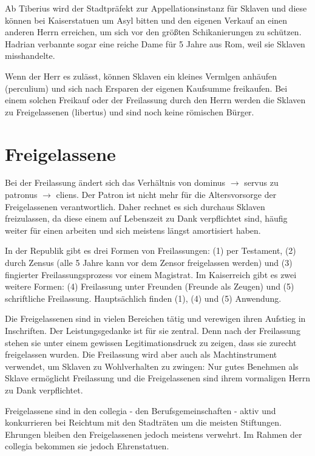 \documentclass[10pt,a4paper,oneside,ngerman,numbers=noenddot]{scrartcl}
\begin{document}
Ab Tiberius wird der Stadtpräfekt zur Appellationsinstanz für Sklaven und diese
können bei Kaiserstatuen um Asyl bitten und den eigenen Verkauf an einen anderen
Herrn erreichen, um sich vor den größten Schikanierungen zu schützen. Hadrian
verbannte sogar eine reiche Dame für 5 Jahre aus Rom, weil sie Sklaven
misshandelte.

Wenn der Herr es zulässt, können Sklaven ein kleines Vermlgen anhäufen (perculium)
und sich nach Ersparen der eigenen Kaufsumme freikaufen. Bei einem solchen
Freikauf oder der Freilassung durch den Herrn werden die Sklaven zu Freigelassenen
(libertus) und sind noch keine römischen Bürger.

\section*{Freigelassene}

Bei der Freilassung ändert sich das Verhältnis von dominus \(\rightarrow\) servus
zu patronus \(\rightarrow\) cliens. Der Patron ist nicht mehr für die
Altersvorsorge der Freigelassenen verantwortlich. Daher rechnet es sich durchaus
Sklaven freizulassen, da diese einem auf Lebenszeit zu Dank verpflichtet sind,
häufig weiter für einen arbeiten und sich meistens längst amortisiert haben.

In der Republik gibt es drei Formen von Freilassungen: (1) per Testament,
(2) durch Zensus (alle 5 Jahre kann vor dem Zensor freigelassen werden) und
(3) fingierter Freilassungsprozess vor einem Magistrat. Im Kaiserreich gibt
es zwei weitere Formen: (4) Freilassung unter Freunden (Freunde als Zeugen)
und (5) schriftliche Freilassung. Hauptsächlich finden (1), (4) und (5) Anwendung.

Die Freigelassenen sind in vielen Bereichen tätig und verewigen ihren Aufstieg
in Inschriften. Der Leistungsgedanke ist für sie zentral. Denn nach der Freilassung
stehen sie unter einem gewissen Legitimationsdruck zu zeigen, dass sie zurecht
freigelassen wurden. Die Freilassung wird aber auch als Machtinstrument verwendet,
um Sklaven zu Wohlverhalten zu zwingen: Nur gutes Benehmen als Sklave ermöglicht
Freilassung und die Freigelassenen sind ihrem vormaligen Herrn zu Dank verpflichtet.

Freigelassene sind in den collegia - den Berufsgemeinschaften - aktiv und
konkurrieren bei Reichtum mit den Stadträten um die meisten Stiftungen. Ehrungen
bleiben den Freigelassenen jedoch meistens verwehrt. Im Rahmen der collegia
bekommen sie jedoch Ehrenstatuen.
\end{document}
